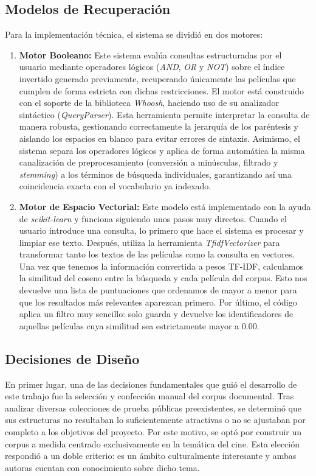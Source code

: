 \documentclass[conference,a4paper]{IEEEtran}
\begin{document}
\subsection{Modelos de Recuperación}
Para la implementación técnica, el sistema se dividió 
en dos motores:
\begin{enumerate}
   \item \textbf{Motor Booleano:} Este sistema evalúa consultas estructuradas por el usuario mediante operadores lógicos (\textit{AND}, \textit{OR} y \textit{NOT}) sobre el índice invertido generado previamente, recuperando únicamente las películas que cumplen de forma estricta con dichas restricciones. El motor está construido con el soporte de la biblioteca \textit{Whoosh}, haciendo uso de su analizador sintáctico (\textit{QueryParser}). Esta herramienta permite interpretar la consulta de manera robusta, gestionando correctamente la jerarquía de los paréntesis y aislando los espacios en blanco para evitar errores de sintaxis. Asimismo, el sistema separa los operadores lógicos y aplica de forma automática la misma canalización de preprocesamiento (conversión a minúsculas, filtrado y \textit{stemming}) a los términos de búsqueda individuales, garantizando así una coincidencia exacta con el vocabulario ya indexado.
   \item \textbf{Motor de Espacio Vectorial:} Este modelo está implementado con la ayuda de \textit{scikit-learn} y funciona siguiendo unos pasos muy directos. Cuando el usuario introduce una consulta, lo primero que hace el sistema es procesar y limpiar ese texto. Después, utiliza la herramienta \textit{TfidfVectorizer} para transformar tanto los textos de las películas como la consulta en vectores. Una vez que tenemos la información convertida a pesos TF-IDF, calculamos la similitud del coseno entre la búsqueda y cada película del corpus. Esto nos devuelve una lista de puntuaciones que ordenamos de mayor a menor para que los resultados más relevantes aparezcan primero. Por último, el código aplica un filtro muy sencillo: solo guarda y devuelve los identificadores de aquellas películas cuya similitud sea estrictamente mayor a 0.00. 
\end{enumerate}

\subsection{Decisiones de Diseño}

En primer lugar, una de las decisiones fundamentales que guió el desarrollo de este trabajo fue la selección y confección manual del corpus documental. Tras analizar diversas colecciones de prueba públicas preexistentes, se determinó que sus estructuras no resultaban lo suficientemente atractivas o no se ajustaban por completo a los objetivos del proyecto. Por este motivo, se optó por construir un corpus a medida centrado exclusivamente en la temática del cine. Esta elección respondió a un doble criterio: es un ámbito culturalmente interesante y ambas autoras cuentan con conocimiento sobre dicho tema. 
\end{document}
